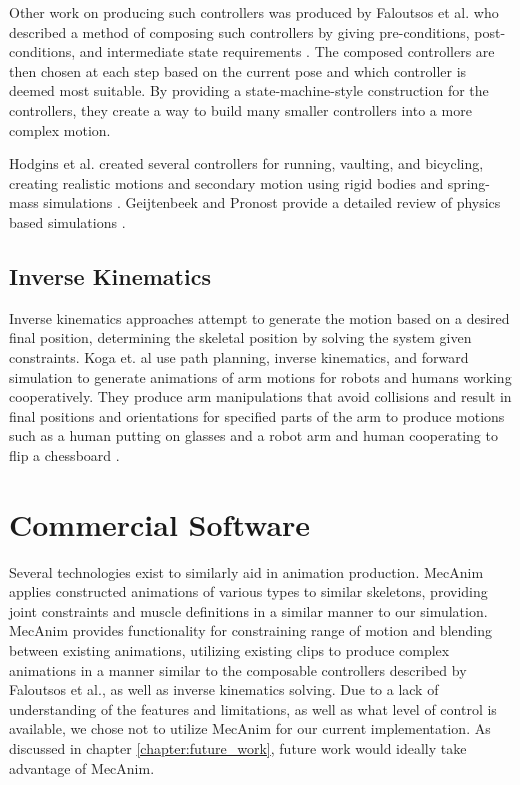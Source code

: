 Other work on producing such controllers was produced by Faloutsos et al. who described a method of composing such controllers by giving pre-conditions, post-conditions, and intermediate state requirements \cite{composable_controllers}.  The composed controllers are then chosen at each step based on the current pose and which controller is deemed most suitable.  By providing a state-machine-style construction for the controllers, they create a way to build many smaller controllers into a more complex motion.

Hodgins et al. created several controllers for running, vaulting, and bicycling, creating realistic motions and secondary motion using rigid bodies and spring-mass simulations \cite{anim_human_athletics}.  Geijtenbeek and Pronost provide a detailed review of physics based simulations \cite{inter_physics_anim}.

\subsection{Inverse Kinematics}
\label{subsection:ik_bg}
Inverse kinematics approaches attempt to generate the motion based on a desired final position, determining the skeletal position by solving the system given constraints.  Koga et. al use path planning, inverse kinematics, and forward simulation to generate animations of arm motions for robots and humans working cooperatively.  They produce arm manipulations that avoid collisions and result in final positions and orientations for specified parts of the arm to produce motions such as a human putting on glasses and a robot arm and human cooperating to flip a chessboard \cite{motion_intentions}.  


\section{Commercial Software}
\label{section:commercial_bg}
Several technologies exist to similarly aid in animation production. \unity{} MecAnim applies constructed animations of various types to similar skeletons, providing joint constraints and muscle definitions in a similar manner to our simulation.  MecAnim provides functionality for constraining range of motion and blending between existing animations, utilizing existing clips to produce complex animations in a manner similar to the composable controllers described by Faloutsos et al., as well as inverse kinematics solving.  Due to a lack of understanding of the features and limitations, as well as what level of control is available, we chose not to utilize MecAnim for our current implementation.  As discussed in chapter \ref{chapter:future_work}, future work would ideally take advantage of MecAnim.

